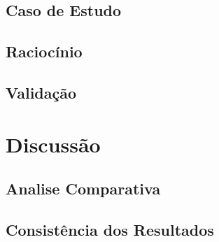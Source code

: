 \documentclass[openright]{normas-utf-tex} %
\begin{document}
	\section{Caso de Estudo} \label{studycase}


			

	\section{Raciocínio} \label{rac}


			
	
	\section{Validação} \label{validation}

			

\chapter{Discussão}

	

	\section{Analise Comparativa}\label{analisecomparativa}

		\label{analisecomparativa}

		
		
		
		
		
	
		
	
		
	
		
		
		
		
		
		

	\section{Consistência dos Resultados}\label{constresult}
\end{document}
